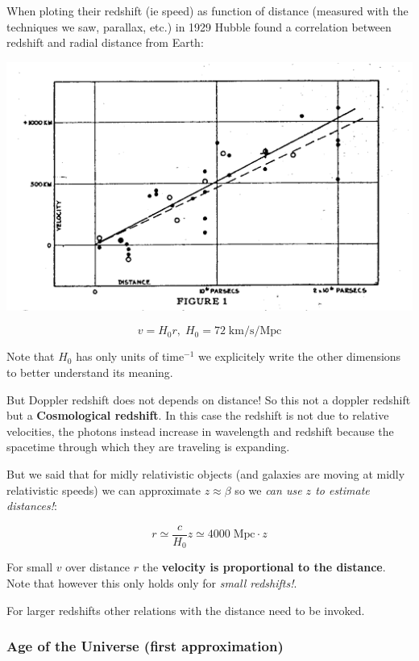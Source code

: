 \documentclass[
  letterpaper,
  DIV=11,
  numbers=noendperiod]{scrreprt}
\begin{document}
When ploting their redshift (ie speed) as function of distance (measured
with the techniques we saw, parallax, etc.) in 1929 Hubble found a
correlation between redshift and radial distance from Earth:

\begin{center}
\includegraphics{images/unnamed.gif}
\end{center}

\[v = H_0 r, \; H_0 = 72\;\mathrm{ km/s/Mpc}\]

Note that \(H_0\) has only units of time\(^{-1}\) we explicitely write
the other dimensions to better understand its meaning.

But Doppler redshift does not depends on distance! So this not a doppler
redshift but a \textbf{Cosmological redshift}. In this case the redshift
is not due to relative velocities, the photons instead increase in
wavelength and redshift because the spacetime through which they are
traveling is expanding.

But we said that for midly relativistic objects (and galaxies are moving
at midly relativistic speeds) we can approximate \(z \approx \beta\) so
we \emph{can use \(z\) to estimate distances!}:

\[r \simeq \frac{c}{H_0}z \simeq 4000\;\mathrm{ Mpc}\cdot z\]

For small \(v\) over distance \(r\) the \textbf{velocity is proportional
to the distance}. Note that however this only holds only for \emph{small
redshifts!}.

For larger redshifts other relations with the distance need to be
invoked.

\subsubsection{Age of the Universe (first
approximation)}\label{age-of-the-universe-first-approximation}
\end{document}
